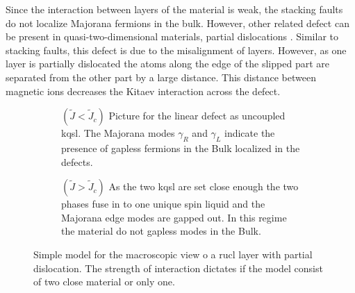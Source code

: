 

Since the interaction between layers of the material is weak, the stacking faults do not localize Majorana fermions in the bulk. However, other related defect can be present in quasi-two-dimensional materials, partial dislocations \cite{solyom-solids}. Similar to stacking faults, this defect is due to the misalignment of layers. However, as one layer is partially dislocated the atoms along the edge of the slipped part are separated from the other part by a large distance. %
This distance between magnetic ions decreases the Kitaev interaction across the defect.



 \begin{figure}[t]
 \centering
        \begin{subfigure}{.45\textwidth}
        \centering
        \hspace*{-5mm}
        \scalebox{1.2}{}
        \caption{$(\tilde{J} < \tilde{J}_c)$ Picture for the linear defect as uncoupled \acrfull{kqsl}. The Majorana modes $\gamma_R$ and $\gamma_L$ indicate the presence of gapless fermions in the Bulk localized in the defects.}
        \label{fig:4-SE1}
    \end{subfigure} \hspace{5mm} %
    \begin{subfigure}{.45\textwidth}
        \centering
        \hspace*{-5mm}
        \scalebox{1.2}{}
        \hspace{5mm}
        \caption{$(\tilde{J} > \tilde{J}_c)$ As the two \acrshort{kqsl} are set close enough the two phases fuse in to one unique spin liquid and the Majorana edge modes are gapped out. In this regime the material do not gapless modes in the Bulk.}
        \label{fig:4-SE2}
    \end{subfigure}
\caption{ Simple model for the macroscopic view o a \acrshort{rucl} layer with partial dislocation. The strength of interaction dictates if the model consist of two close material or only one. }
\end{figure}



